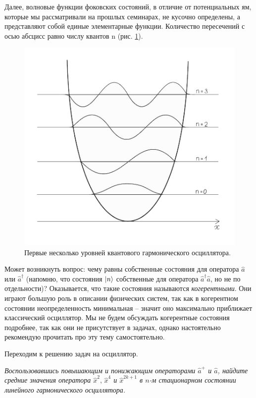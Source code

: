 Далее, волновые функции фоковских состояний, в отличие от потенциальных ям, которые мы рассматривали на прошлых семинарах, не кусочно определены, а представляют собой единые элементарные функции. Количество пересечений с осью абсцисс равно числу квантов n (рис. \ref{fig 6.8}). 
\begin{figure}[!ht]
\centering
\includegraphics[scale=0.28]{class_6/images/oscillator.png}
\caption{Первые несколько уровней квантового гармонического осциллятора.}
\label{fig 6.8}
\end{figure}
\newpage
Может возникнуть вопрос: чему равны собственные состояния для оператора $\hat{a}$ или $\hat{a}^{\dagger}$ (напомню, что состояния $\ket{n}$ собственные для оператора $\hat{a}^{\dagger}\hat{a}$, но не по отдельности)? Оказывается, что такие состояния называются \textit{когерентными}. Они играют большую роль в описании физических систем, так как в когерентном состоянии неопределенность минимальная – значит оно максимально приближает классический осциллятор. Мы не будем обсуждать когерентные состояния подробнее, так как они не присутствует в задачах, однако настоятельно рекомендую прочитать про эту тему самостоятельно. 

Переходим к решению задач на осциллятор.

\begin{center}
    \textit{Воспользовавшись повышающим и понижающим операторами $\hat a^+$ и $\hat a$, найдите средние значения оператора $\hat x^2,\,
    \hat x^4$ и $\hat x^{2k+1}$ в $n$-м стационарном состоянии линейного гармонического осциллятора.}
\end{center}

